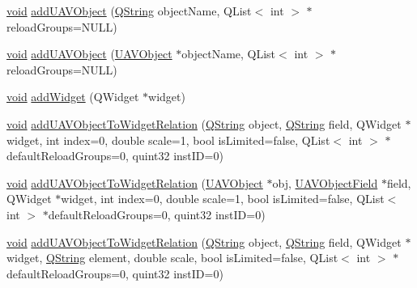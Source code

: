 \begin{DoxyCompactItemize}
\hyperlink{group___u_a_v_objects_plugin_ga444cf2ff3f0ecbe028adce838d373f5c}{void} \hyperlink{group___u_a_v_object_widget_utils_ga82f371b1291826ec74341dddfe827c83}{add\-U\-A\-V\-Object} (\hyperlink{group___u_a_v_objects_plugin_gab9d252f49c333c94a72f97ce3105a32d}{\-Q\-String} object\-Name, \-Q\-List$<$ int $>$ $\ast$reload\-Groups=\-N\-U\-L\-L)
\item 
\hyperlink{group___u_a_v_objects_plugin_ga444cf2ff3f0ecbe028adce838d373f5c}{void} \hyperlink{group___u_a_v_object_widget_utils_gac56e252ece21406583d59af2b70c2565}{add\-U\-A\-V\-Object} (\hyperlink{class_u_a_v_object}{\-U\-A\-V\-Object} $\ast$object\-Name, \-Q\-List$<$ int $>$ $\ast$reload\-Groups=\-N\-U\-L\-L)
\item 
\hyperlink{group___u_a_v_objects_plugin_ga444cf2ff3f0ecbe028adce838d373f5c}{void} \hyperlink{group___u_a_v_object_widget_utils_ga3edd7677e362be586b059c066e0a4e30}{add\-Widget} (\-Q\-Widget $\ast$widget)
\item 
\hyperlink{group___u_a_v_objects_plugin_ga444cf2ff3f0ecbe028adce838d373f5c}{void} \hyperlink{group___u_a_v_object_widget_utils_ga8f5d01ae74d161f7b85d123e66c49451}{add\-U\-A\-V\-Object\-To\-Widget\-Relation} (\hyperlink{group___u_a_v_objects_plugin_gab9d252f49c333c94a72f97ce3105a32d}{\-Q\-String} object, \hyperlink{group___u_a_v_objects_plugin_gab9d252f49c333c94a72f97ce3105a32d}{\-Q\-String} field, \-Q\-Widget $\ast$widget, int index=0, double scale=1, bool is\-Limited=false, \-Q\-List$<$ int $>$ $\ast$default\-Reload\-Groups=0, quint32 inst\-I\-D=0)
\item 
\hyperlink{group___u_a_v_objects_plugin_ga444cf2ff3f0ecbe028adce838d373f5c}{void} \hyperlink{group___u_a_v_object_widget_utils_ga9516761ea1de60250535bdebc9dd7fa9}{add\-U\-A\-V\-Object\-To\-Widget\-Relation} (\hyperlink{class_u_a_v_object}{\-U\-A\-V\-Object} $\ast$obj, \hyperlink{class_u_a_v_object_field}{\-U\-A\-V\-Object\-Field} $\ast$field, \-Q\-Widget $\ast$widget, int index=0, double scale=1, bool is\-Limited=false, \-Q\-List$<$ int $>$ $\ast$default\-Reload\-Groups=0, quint32 inst\-I\-D=0)
\item 
\hyperlink{group___u_a_v_objects_plugin_ga444cf2ff3f0ecbe028adce838d373f5c}{void} \hyperlink{group___u_a_v_object_widget_utils_ga929ce6a70bab7ab756f3d7df22ee4427}{add\-U\-A\-V\-Object\-To\-Widget\-Relation} (\hyperlink{group___u_a_v_objects_plugin_gab9d252f49c333c94a72f97ce3105a32d}{\-Q\-String} object, \hyperlink{group___u_a_v_objects_plugin_gab9d252f49c333c94a72f97ce3105a32d}{\-Q\-String} field, \-Q\-Widget $\ast$widget, \hyperlink{group___u_a_v_objects_plugin_gab9d252f49c333c94a72f97ce3105a32d}{\-Q\-String} element, double scale, bool is\-Limited=false, \-Q\-List$<$ int $>$ $\ast$default\-Reload\-Groups=0, quint32 inst\-I\-D=0)

\end{DoxyCompactItemize}

